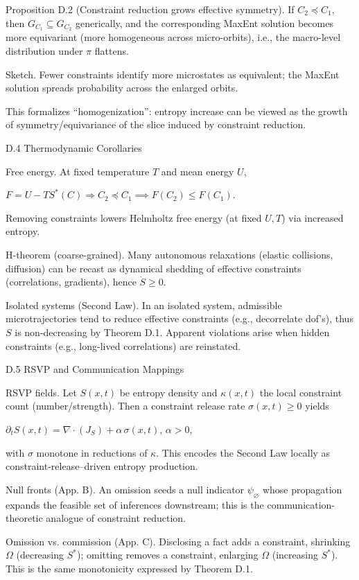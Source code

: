 \documentclass[11pt,a4paper]{article}
\begin{document}
Proposition D.2 (Constraint reduction grows effective symmetry).
If $C_2 \preceq C_1$, then $G_{C_1} \subseteq G_{C_2}$ generically, and the corresponding MaxEnt solution becomes more equivariant (more homogeneous across micro-orbits), i.e., the macro-level distribution under $\pi$ flattens.

Sketch. Fewer constraints identify more microstates as equivalent; the MaxEnt solution spreads probability across the enlarged orbits.

This formalizes “homogenization”: entropy increase can be viewed as the growth of symmetry/equivariance of the slice induced by constraint reduction.

D.4 Thermodynamic Corollaries

Free energy. At fixed temperature $T$ and mean energy $U$,

$F = U - T S^*(C) \Rightarrow C_2 \preceq C_1 \implies F(C_2) \leq F(C_1)$.

Removing constraints lowers Helmholtz free energy (at fixed $U,T$) via increased entropy.

H-theorem (coarse-grained). Many autonomous relaxations (elastic collisions, diffusion) can be recast as dynamical shedding of effective constraints (correlations, gradients), hence $\dot S \geq 0$.

Isolated systems (Second Law). In an isolated system, admissible microtrajectories tend to reduce effective constraints (e.g., decorrelate dof’s), thus $S$ is non-decreasing by Theorem D.1. Apparent violations arise when hidden constraints (e.g., long-lived correlations) are reinstated.

D.5 RSVP and Communication Mappings

RSVP fields. Let $S(x,t)$ be entropy density and $\kappa(x,t)$ the local constraint count (number/strength). Then a constraint release rate $\sigma(x,t) \geq 0$ yields

$\partial_t S(x,t) = \nabla \cdot (J_S) + \alpha \, \sigma(x,t)$, $\alpha > 0$,

with $\sigma$ monotone in reductions of $\kappa$. This encodes the Second Law locally as constraint-release–driven entropy production.

Null fronts (App. B). An omission seeds a null indicator $\psi_\varnothing$ whose propagation expands the feasible set of inferences downstream; this is the communication-theoretic analogue of constraint reduction.

Omission vs. commission (App. C). Disclosing a fact adds a constraint, shrinking $\Omega$ (decreasing $S^*$); omitting removes a constraint, enlarging $\Omega$ (increasing $S^*$). This is the same monotonicity expressed by Theorem D.1.
\end{document}
